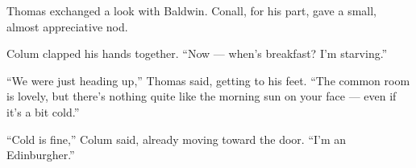 Thomas exchanged a look with Baldwin. Conall, for his part, gave a small, almost appreciative nod.

Colum clapped his hands together. \enquote{Now --- when's breakfast? I'm starving.}

\enquote{We were just heading up,} Thomas said, getting to his feet. \enquote{The common room is lovely, but there's nothing quite like the morning sun on your face — even if it's a bit cold.}

\enquote{Cold is fine,} Colum said, already moving toward the door. \enquote{I'm an Edinburgher.}
